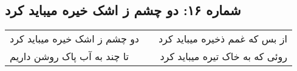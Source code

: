 \begin{center}
\section*{شماره ۱۶: دو چشم ز اشک خیره میباید کرد}
\label{sec:016}
\begin{longtable}{l p{0.5cm} r}
دو چشم ز اشک خیره میباید کرد
&&
از بس که غمم ذخیره میباید کرد
\\
تا چند به آب پاک روشن داریم
&&
روئی که به خاک تیره میباید کرد
\\
\end{longtable}
\end{center}
